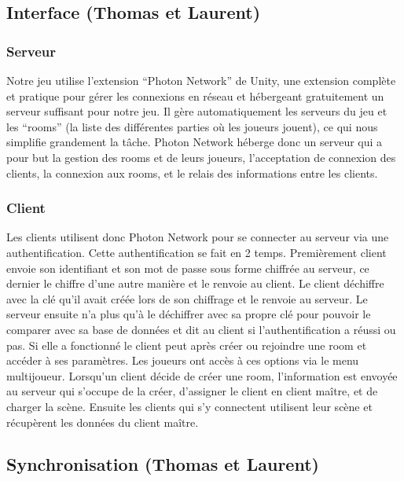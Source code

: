 \documentclass[a4paper , 12pt]{article}
\begin{document}
	\subsection{Interface (Thomas et Laurent)}

	\subsubsection{Serveur}
	
	\quad

Notre jeu utilise l’extension “Photon Network” de Unity, une extension complète et pratique pour gérer les connexions en réseau et hébergeant gratuitement un serveur suffisant pour notre jeu. Il gère automatiquement les serveurs du jeu et les “rooms” (la liste des différentes parties où les joueurs jouent), ce qui nous simplifie grandement la tâche. Photon Network héberge donc un serveur qui a pour but la gestion des rooms et de leurs joueurs, l’acceptation de connexion des clients, la connexion aux rooms, et le relais des informations entre les clients.
            

\quad

	\subsubsection{Client}

	\quad

Les clients utilisent donc Photon Network pour se connecter au serveur via une authentification. Cette authentification se fait en 2 temps. Premièrement client envoie son identifiant et son mot de passe sous forme chiffrée au serveur, ce dernier le chiffre d’une autre manière et le renvoie au client. Le client déchiffre avec la clé qu’il avait créée lors de son chiffrage et le renvoie au serveur. Le serveur ensuite n’a plus qu’à le déchiffrer avec sa propre clé pour pouvoir le comparer avec sa base de données et dit au client si l’authentification a réussi ou pas. Si elle a fonctionné le client peut après créer ou rejoindre une room et accéder à ses paramètres. Les joueurs ont accès à ces options via le menu multijoueur. Lorsqu’un client décide de créer une room, l’information est envoyée au serveur qui s’occupe de la créer, d’assigner le client en client maître, et de charger la scène. Ensuite les clients qui s’y connectent utilisent leur scène et récupèrent les données du client maître.
            

\quad

	\subsection{Synchronisation (Thomas et Laurent)}
\end{document}
